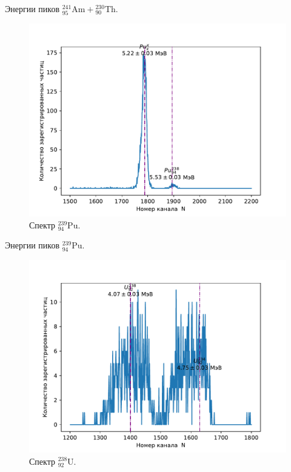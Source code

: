 \documentclass[10pt,a4paper]{article}
\newcommand{\elem}[3]{{}^{#2}_{#3}\text{#1}}
\newcommand{\Pu}{\elem{Pu}{239}{94}}
\newcommand{\Ua}{\elem{U}{238}{92}}
\newcommand{\Th}{\elem{Th}{230}{90}}
\newcommand{\Am}{\elem{Am}{241}{95}}
\begin{document}
\begin{multicols}{2}
	\vspace*{-1cm}
	
	\begin{table}[H]
		\addtolength{\tabcolsep}{-4pt}
		\footnotesize
		
		\caption{Энергии пиков $\Am + \Th$.}
		\label{tab:th_am}
	\end{table}
	
	\vspace*{-1cm}
	
	\begin{figure}[H]
		\includegraphics[width=1\textwidth]{gen/fig-pu.pdf}
		\caption{Спектр $\Pu$.}
		\label{fig:pu}
	\end{figure}
	
	\vspace*{-1cm}
	
	\begin{table}[H]
		\addtolength{\tabcolsep}{-4pt}
		\footnotesize
		
		\caption{Энергии пиков $\Pu$.}
		\label{tab:pu}
	\end{table}
	
	\vspace*{-1cm}
	
	\begin{figure}[H]
		\includegraphics[width=1\textwidth]{gen/fig-u.pdf}
		\caption{Спектр $\Ua$.}
		\label{fig:u}
	\end{figure}
	

\end{multicols}
\end{document}
